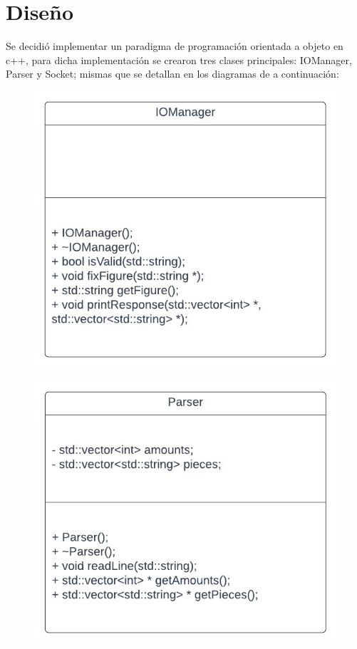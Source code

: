 \documentclass[a4paper,10pt]{article}
\begin{document}
	\section{Diseño}
    Se decidió implementar un paradigma de programación orientada a objeto en c++, para dicha implementación se crearon tres clases principales: IOManager, Parser y Socket; mismas que se detallan en los diagramas de a continuación:
    \vfill
    	 \begin{figure}[ht]
 	  \centering
 	  \includegraphics[scale=2]{IOManager.jpeg}
	 \end{figure}
	 
	 \begin{figure}[ht]
 	  \centering
 	  \includegraphics[scale=2]{Parser.jpeg}
	 \end{figure}
\end{document}
